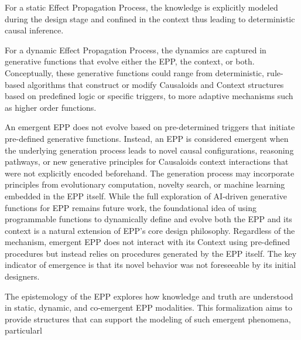 For a static Effect Propagation Process, the knowledge is explicitly modeled during the design stage and confined in the context thus leading to deterministic causal inference. 

For a dynamic Effect Propagation Process, the dynamics are captured in generative functions that evolve either the EPP, the context, or both. Conceptually, these generative functions could range from deterministic, rule-based algorithms that construct or modify Causaloids and Context structures based on predefined logic or specific triggers, to more adaptive mechanisms such as higher order functions.

An emergent EPP does not evolve based on pre-determined triggers that initiate pre-defined generative functions. Instead, an EPP is considered emergent when the underlying generation process leads to novel causal configurations, reasoning pathways, or new generative principles for Causaloids context interactions that were not explicitly encoded beforehand.
The generation process may incorporate principles from evolutionary computation, novelty search, or machine learning embedded in the EPP itself. While the full exploration of AI-driven generative functions for EPP remains future work, the foundational idea of using programmable functions to dynamically define and evolve both the EPP and its context is a natural extension of EPP's core design philosophy. Regardless of the mechanism, emergent EPP does not interact with its Context using pre-defined procedures but instead relies on procedures generated by the EPP itself. The key indicator of emergence is that its novel behavior was not foreseeable by its initial designers.

The epistemology of the EPP\cite{Hansen2025EPP_Epistemology} explores how knowledge and truth are understood in static, dynamic, and co-emergent EPP modalities. This formalization aims to provide structures that can support the modeling of such emergent phenomena, particularl